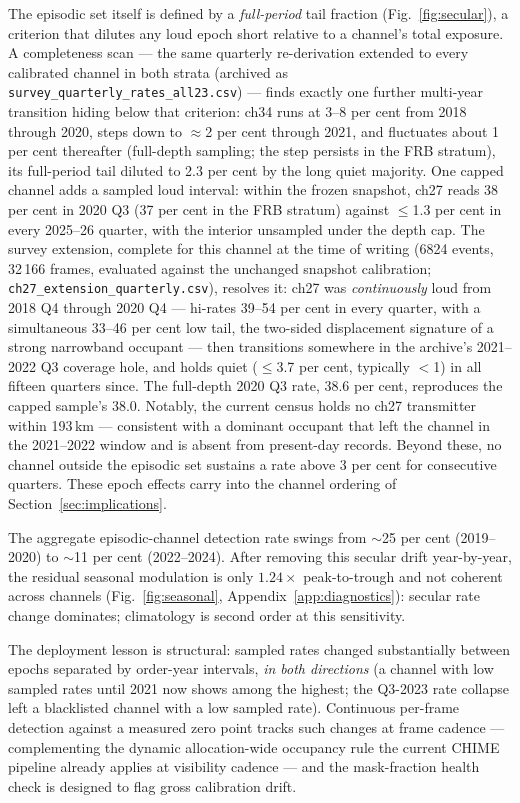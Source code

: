 The episodic set itself is defined by a \emph{full-period} tail
fraction (Fig.~\ref{fig:secular}), a criterion that dilutes any loud
epoch short relative to a channel's total exposure. A completeness
scan --- the same quarterly re-derivation extended to every calibrated
channel in both strata (archived as
\texttt{survey\_quarterly\_rates\_all23.csv}) --- finds exactly one
further multi-year transition hiding below that criterion: ch34 runs
at 3--8 per cent from 2018 through 2020, steps down to $\approx$2 per
cent through 2021, and fluctuates about 1 per cent thereafter
(full-depth sampling; the step persists in the FRB stratum), its
full-period tail diluted to 2.3 per cent by the long quiet majority.
One capped channel adds a sampled loud interval: within the frozen
snapshot, ch27 reads 38 per cent in 2020 Q3 (37 per cent in the FRB
stratum) against $\le$1.3 per cent in every 2025--26 quarter, with the
interior unsampled under the depth cap. The survey extension, complete
for this channel at the time of writing (6824 events, 32\,166 frames,
evaluated against the unchanged snapshot calibration;
\texttt{ch27\_extension\_quarterly.csv}), resolves it: ch27 was
\emph{continuously} loud from 2018 Q4 through 2020 Q4 --- hi-rates
39--54 per cent in every quarter, with a simultaneous 33--46 per cent
low tail, the two-sided displacement signature of a strong narrowband
occupant --- then transitions somewhere in the archive's 2021--2022 Q3
coverage hole, and holds quiet ($\le$3.7 per cent, typically $<$1) in
all fifteen quarters since. The full-depth 2020 Q3 rate, 38.6 per
cent, reproduces the capped sample's 38.0. Notably, the current
census holds no ch27 transmitter within 193\,km --- consistent with a
dominant occupant that left the channel in the 2021--2022 window and
is absent from present-day records. Beyond these, no channel
outside the episodic set sustains a rate above 3 per cent for
consecutive quarters. These epoch effects carry into the channel
ordering of Section~\ref{sec:implications}.

The
aggregate episodic-channel detection rate swings from $\sim$25 per cent
(2019--2020) to $\sim$11 per cent (2022--2024). After removing this secular
drift year-by-year, the residual seasonal modulation is only
$1.24\times$ peak-to-trough and not coherent across channels
(Fig.~\ref{fig:seasonal}, Appendix~\ref{app:diagnostics}):
secular rate change dominates; climatology is second order at this
sensitivity.

The deployment lesson is structural: sampled rates changed substantially
between epochs separated by order-year intervals,
\emph{in both directions} (a channel with low sampled rates until 2021
now shows among the highest; the Q3-2023 rate collapse left a blacklisted
channel with a low sampled rate). Continuous per-frame detection against
a measured zero point tracks such changes at frame cadence ---
complementing the dynamic allocation-wide occupancy rule the current
CHIME pipeline already applies at visibility cadence
\citep[Appendix~A]{chime2025autopower} --- and the mask-fraction health
check is designed to flag gross calibration drift.

